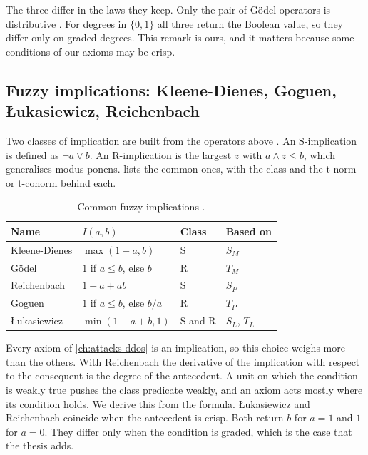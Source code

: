The three differ in the laws they keep. Only the pair of G\"odel operators is
distributive \citep{badreddine2022ltn}. For degrees in $\{0,1\}$ all three
return the Boolean value, so they differ only on graded degrees. This remark
is ours, and it matters because some conditions of our axioms may be crisp.

\subsection{Fuzzy implications: Kleene-Dienes, Goguen, {\L}ukasiewicz, Reichenbach}
\label{sec:fuzzy-implications}

Two classes of implication are built from the operators above
\citep{badreddine2022ltn}. An S-implication is defined as $\neg a\vee b$. An
R-implication is the largest $z$ with $a\wedge z\leq b$, which generalises
modus ponens.  lists the common ones, with the class and
the t-norm or t-conorm behind each.

\begin{table}[htbp]
\centering
\footnotesize
\caption{Common fuzzy implications \citep{badreddine2022ltn}.}
\label{tab:implications}
\begin{tabular}{@{}llll@{}}
\toprule
Name & $I(a,b)$ & Class & Based on \\
\midrule
Kleene-Dienes & $\max(1-a,b)$ & S & $S_M$ \\
G\"odel & $1$ if $a\leq b$, else $b$ & R & $T_M$ \\
Reichenbach & $1-a+ab$ & S & $S_P$ \\
Goguen & $1$ if $a\leq b$, else $b/a$ & R & $T_P$ \\
{\L}ukasiewicz & $\min(1-a+b,1)$ & S and R & $S_L$, $T_L$ \\
\bottomrule
\end{tabular}
\end{table}

Every axiom of \cref{ch:attacks-ddos} is an implication, so this choice weighs
more than the others. With Reichenbach the derivative of the implication with
respect to the consequent is the degree of the antecedent. A unit on which
the condition is weakly true pushes the class predicate weakly, and an axiom
acts mostly where its condition holds. We derive this from the formula. {\L}ukasiewicz and Reichenbach coincide when the
antecedent is crisp. Both return $b$ for $a=1$ and $1$ for $a=0$. They differ
only when the condition is graded, which is the case that the thesis adds.


